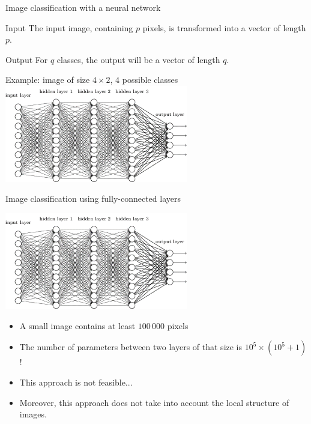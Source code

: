 \documentclass[xcolor=pdftex,dvipsnames,table,mathserif]{beamer}
\begin{document}
\begin{frame}{Image classification with a neural network}

  \begin{block}{Input}
    The input image, containing $p$ pixels, is transformed into a vector of length $p$.
  \end{block}

  \begin{block}{Output}
    For $q$ classes, the output will be a vector of length $q$.
  \end{block}

\pause

  \begin{block}{Example: image of size $4 \times 2$, $4$ possible classes}
    \centering
      \includegraphics[width=0.6\textwidth]{network}
  \end{block}

\end{frame}


\begin{frame}{Image classification using fully-connected layers}

    \centering
      \includegraphics[width=0.6\textwidth]{network}

      \begin{itemize}[<+->]
      \item A small image contains at least $100\,000$ pixels
      \item The number of parameters between two layers of that size is $10^5 \times (10^5 + 1)$!
      \item This approach is not feasible...
      \item Moreover, this approach does not take into account the local structure of images.
      \end{itemize}

\end{frame}
\end{document}
